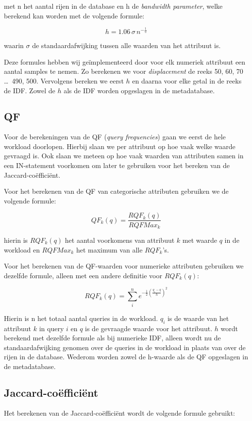 \documentclass[a4paper,oneside]{article}
\begin{document}
\noindent
met n het aantal rijen in de database en h de \emph{bandwidth parameter}, welke berekend kan worden met de volgende formule:

$$h = 1.06\,\sigma\,n^{-\frac{1}{5}}$$

\noindent
waarin $\sigma$ de standaardafwijking tussen alle waarden van het attribuut is.

Deze formules hebben wij ge\"implementeerd door voor elk numeriek attribuut een aantal samples te nemen. Zo berekenen we voor \emph{displacement} de reeks 50, 60, 70 \ldots\ 490, 500. Vervolgens bereken we eerst $h$ en daarna voor elke getal in de reeks de IDF. Zowel de $h$ als de IDF worden opgeslagen in de metadatabase.


\subsection{QF}
Voor de berekeningen van de QF (\emph{query frequencies}) gaan we eerst de hele workload doorlopen. Hierbij slaan we per attribuut op hoe vaak welke waarde gevraagd is. Ook slaan we meteen op hoe vaak waarden van attributen samen in een IN-statement voorkomen om  later te gebruiken voor het bereken van de Jaccard-co\"effici\"ent.

Voor het berekenen van de QF van categorische attributen gebruiken we de volgende formule:

$$QF_k(q) = \frac{RQF_k(q)}{RQFMax_k}$$

\noindent
hierin is $RQF_k(q)$ het aantal voorkomens van attribuut $k$ met waarde $q$ in de workload en $RQFMax_k$ het maximum van alle $RQF_k$'s.

Voor het berekenen van de QF-waarden voor numerieke attributen gebruiken we dezelfde formule, alleen met een andere definitie voor $RQF_k(q)$:

$$RQF_k(q) = \sum\limits_i^n e^{-\frac{1}{2}\left(\frac{q_i-q}{h}\right)^2}$$

\noindent
Hierin is n het totaal aantal queries in de workload. $q_i$ is de waarde van het attribuut $k$ in query $i$ en $q$ is de gevraagde waarde voor het attribuut. $h$ wordt berekend met dezelfde formule als bij numerieke IDF, alleen wordt nu de standaardafwijking genomen over de queries in de workload in plaats van over de rijen in de database. Wederom worden zowel de h-waarde als de QF opgeslagen in de metadatabase.


\subsection{Jaccard-co\"effici\"ent}
Het berekenen van de Jaccard-co\"effici\"ent wordt de volgende formule gebruikt:
\end{document}
